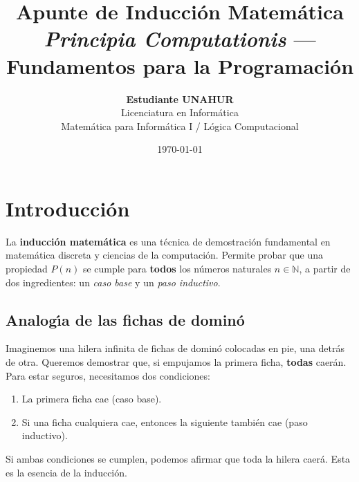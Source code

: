\documentclass[11pt,a4paper]{article}
\theoremstyle{definition}
\theoremstyle{plain}
\theoremstyle{definition}
\theoremstyle{definition}
\theoremstyle{remark}
\newcommand{\N}{\mathbb{N}}               %
\begin{document}
\title{\Huge \textbf{Apunte de Inducci\'on Matem\'atica} \\[0.3cm]
       \large \textit{Principia Computationis} --- Fundamentos para la Programaci\'on}
\author{\textbf{Estudiante UNAHUR} \\[0.2cm]
        Licenciatura en Inform\'atica \\[0.2cm]
        Matem\'atica para Inform\'atica I / L\'ogica Computacional}
\date{\today}

\maketitle
\thispagestyle{empty}  %
\newpage

\tableofcontents
\newpage

\section{Introducci\'on}

La \textbf{inducci\'on matem\'atica} es una t\'ecnica de demostraci\'on fundamental
en matem\'atica discreta y ciencias de la computaci\'on. Permite probar que una
propiedad $P(n)$ se cumple para \textbf{todos} los n\'umeros naturales $n \in \N$,
a partir de dos ingredientes: un \emph{caso base} y un \emph{paso inductivo}.

\subsection*{Analog\'{\i}a de las fichas de domin\'o}
\label{sec:domino}

Imaginemos una hilera infinita de fichas de domin\'o colocadas en pie, una detr\'as de
otra. Queremos demostrar que, si empujamos la primera ficha, \textbf{todas} caer\'an.
Para estar seguros, necesitamos dos condiciones:
\begin{enumerate}
    \item La primera ficha cae (caso base).
    \item Si una ficha cualquiera cae, entonces la siguiente tambi\'en cae
          (paso inductivo).
\end{enumerate}
Si ambas condiciones se cumplen, podemos afirmar que toda la hilera caer\'a.
Esta es la esencia de la inducci\'on.
\end{document}
